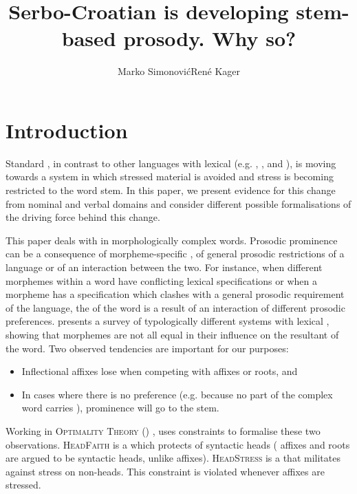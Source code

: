 \documentclass[output=paper,nonflat,colorlinks,citecolor=brown,newtxmath]{langsci/langscibook}
\title{Serbo-Croatian is developing stem-based prosody. Why so?}
\author{Marko Simonović\affiliation{University of Nova Gorica}\orcid{0000-0002-9651-6399}\lastand René Kager\affiliation{Utrecht University}\orcid{0000-0002-5811-839X}}
\begin{document}
\maketitle
{}
\section{Introduction} \label{sec:kager:1}
\sloppy Standard , in contrast to other  languages with lexical  (e.g. , , and ), is moving towards a system in which stressed  material is avoided and stress is becoming restricted to the word stem. In this paper, we present evidence for this change from nominal and verbal domains and consider different possible formalisations of the driving force behind this change.

This paper deals with  in morphologically complex words. Prosodic prominence can be a consequence of morpheme-specific , of general prosodic restrictions of a language or of an interaction between the two. For instance, when different morphemes within a word have conflicting lexical specifications or when a morpheme has a specification which clashes with a general prosodic requirement of the language, the  of the word is a result of an interaction of different prosodic preferences. \citet{Revithiadou1999} presents a survey of typologically different systems with lexical , showing that morphemes are not all equal in their influence on the resultant  of the word. Two observed tendencies are important for our purposes:

\begin{itemize}
\item Inflectional affixes lose when competing with  affixes or roots, and
\item In cases where there is no preference (e.g. because no part of the complex word carries ), prominence will go to the stem.
\end{itemize}

\noindent Working in \textsc{Optimality Theory} () \citep[]{Prince1993}, \citet{Revithiadou1999} uses constraints to formalise these two observations. \textsc{HeadFaith} is a  which protects  of syntactic heads ( affixes and roots are argued to be syntactic heads, unlike  affixes). \textsc{HeadStress} is a  that militates against stress on non-heads. This constraint is violated whenever  affixes are stressed.
\end{document}

